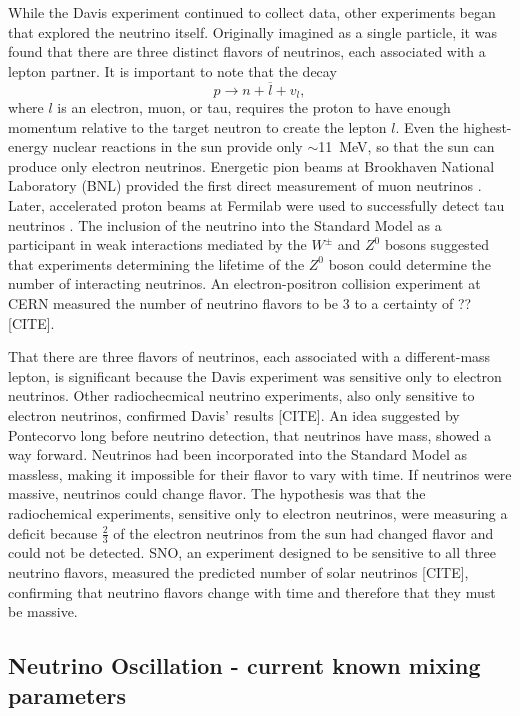 While the Davis experiment continued to collect data, other experiments began that explored the neutrino itself.  Originally imagined as a single particle, it was found that there are three distinct flavors of neutrinos, each associated with a lepton partner.  It is important to note that the decay 
\begin{equation}
p \rightarrow n + \overline{l} + v_l,
\end{equation}
where $l$ is an electron, muon, or tau, requires the proton to have enough momentum relative to the target neutron to create the lepton $l$.  Even the highest-energy nuclear reactions in the sun provide only $\sim$11~MeV, so that the sun can produce only electron neutrinos.  Energetic pion beams at Brookhaven National Laboratory (BNL) provided the first direct measurement of muon neutrinos \cite{muonNeutrino}.  Later, accelerated proton beams at Fermilab were used to successfully detect tau neutrinos \cite{tauNeutrino}.  The inclusion of the neutrino into the Standard Model as a participant in weak interactions mediated by the $W^{\pm}$ and $Z^0$ bosons suggested that experiments determining the lifetime of the $Z^0$ boson could determine the number of interacting neutrinos.  An electron-positron collision experiment at CERN measured the number of neutrino flavors to be 3 to a certainty of ?? [CITE].

That there are three flavors of neutrinos, each associated with a different-mass lepton, is significant because the Davis experiment was sensitive only to electron neutrinos.  Other radiochecmical neutrino experiments, also only sensitive to electron neutrinos, confirmed Davis' results [CITE].  An idea suggested by Pontecorvo long before neutrino detection, that neutrinos have mass, showed a way forward.  Neutrinos had been incorporated into the Standard Model as massless, making it impossible for their flavor to vary with time.  If neutrinos were massive, neutrinos could change flavor.  The hypothesis was that the radiochemical experiments, sensitive only to electron neutrinos, were measuring a deficit because $\frac{2}{3}$ of the electron neutrinos from the sun had changed flavor and could not be detected.  SNO, an experiment designed to be sensitive to all three neutrino flavors, measured the predicted number of solar neutrinos [CITE], confirming that neutrino flavors change with time and therefore that they must be massive.


\subsection{Neutrino Oscillation - current known mixing parameters}

